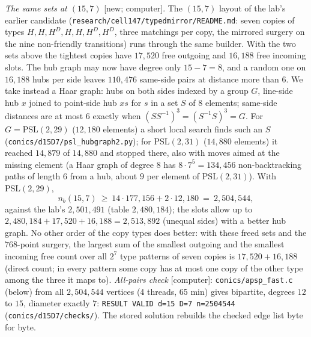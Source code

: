 \documentclass[11pt]{amsart}
\theoremstyle{definition}
\theoremstyle{remark}
\newcommand{\status}[1]{\textup{[#1]}}
\begin{document}
\emph{The same sets at $(15,7)$} \status{new; computer}. The $(15,7)$ layout of the lab's earlier candidate
(\texttt{research/cell147/typedmirror/README.md}: seven copies of types $H,H,H^D,H,H,H^D,H^D$, three matchings per
copy, the mirrored surgery on the nine non-friendly transitions) runs through the same builder. With the two sets above
the tightest copies have $17{,}520$ free outgoing and $16{,}188$ free incoming slots. The hub graph may now have degree
only $15-7=8$, and a random one on $16{,}188$ hubs per side leaves $110{,}476$ same-side pairs at distance more than $6$.
We take instead a Haar graph: hubs on both sides indexed by a group $G$, line-side hub $x$ joined to point-side hub $xs$
for $s$ in a set $S$ of $8$ elements; same-side distances are at most $6$ exactly when $(SS^{-1})^3=(S^{-1}S)^3=G$.
For $G=\mathrm{PSL}(2,29)$ ($12{,}180$ elements) a short local search finds such an $S$
(\texttt{conics/d15D7/psl\_hubgraph2.py}); for $\mathrm{PSL}(2,31)$ ($14{,}880$ elements) it reached $14{,}879$ of
$14{,}880$ and stopped there, also with moves aimed at the missing element (a Haar graph of degree $8$ has
$8\cdot7^5=134{,}456$ non-backtracking paths of length $6$ from a hub, about $9$ per element of $\mathrm{PSL}(2,31)$). With $\mathrm{PSL}(2,29)$,
$$n_b(15,7)\ \ge\ 14\cdot177{,}156+2\cdot12{,}180\ =\ 2{,}504{,}544,$$
against the lab's $2{,}501{,}491$ (table $2{,}480{,}184$); the slots allow up to $2{,}480{,}184+17{,}520+16{,}188=2{,}513{,}892$ (unequal sides) with a better hub graph. No other order of the copy types does better: with these freed sets and
the $768$-point surgery, the largest sum of the smallest outgoing and the smallest incoming free count over all $2^7$
type patterns of seven copies is $17{,}520+16{,}188$ (direct count; in every pattern some copy has at most one copy of
the other type among the three it maps to).
\emph{All-pairs check} \status{computer}: \texttt{conics/apsp\_fast.c} (below) from all $2{,}504{,}544$ vertices (4
threads, 65 min) gives bipartite, degrees $12$ to $15$, diameter exactly $7$: \texttt{RESULT VALID d=15 D=7
n=2504544} (\texttt{conics/d15D7/checks/}). The stored solution rebuilds the checked edge list byte for byte.
\end{document}
